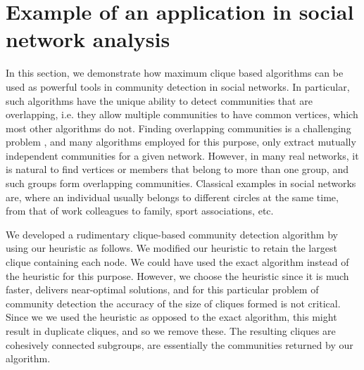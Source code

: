 \section{Example of an application in social network analysis}
\label{sec:applications}

In this section, we demonstrate how maximum clique based algorithms can be used as powerful tools in community detection in social networks. In particular, such algorithms have the unique ability to detect communities that are overlapping, i.e. they allow multiple communities to have common vertices, which most other algorithms do not.
Finding overlapping communities is a challenging problem \cite{Fortunato_2010}, and many algorithms employed for this purpose, only extract mutually independent communities for a given network. However, in many real networks, it is natural to find vertices or members that belong to more than one group, and such groups form overlapping communities. Classical examples in social networks are, where an individual usually belongs to different circles at the same time, from that of work colleagues to family, sport associations, etc. 

We developed a rudimentary clique-based community detection algorithm by using our heuristic as follows. We modified our heuristic to retain the largest clique containing each node. We could have used the exact algorithm instead of the heuristic for this purpose. However, we choose the heuristic since it is much faster, delivers near-optimal solutions, and for this particular problem of community detection the accuracy of the size of cliques formed is not critical. Since we we used the heuristic as opposed to the exact algorithm, this might result in duplicate cliques,  %
and so we remove these. The resulting cliques are cohesively connected subgroups, are essentially the communities returned by our algorithm.




